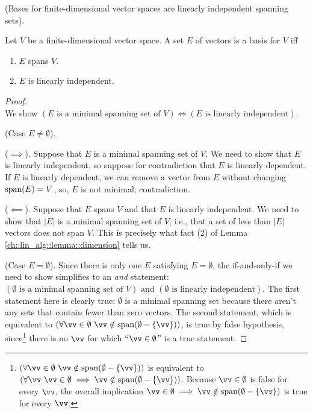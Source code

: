 \begin{theorem}
    (Bases for finite-dimensional vector spaces are linearly independent spanning sets).
    
    Let $V$ be a finite-dimensional vector space. A set $E$ of vectors is a basis for $V$ iff
    
    \begin{enumerate}
        \item $E$ spans $V$.
        \item $E$ is linearly independent.
    \end{enumerate}
\end{theorem}

\begin{proof}
    \mbox{} \\ \indent
    We show $(\text{$E$ is a minimal spanning set of $V$}) \iff (\text{$E$ is linearly independent})$.
    
    (Case $E \neq \emptyset$).
    
    \indent ($\implies$). Suppose that $E$ is a minimal spanning set of $V$. We need to show that $E$ is linearly independent, so suppose for contradiction that $E$ is linearly dependent. If $E$ is linearly dependent, we can remove a vector from $E$ without changing $\text{span}(E) = V$, so, $E$ is not minimal; contradiction.
    
    \indent ($\impliedby$). Suppose that $E$ spans $V$ and that $E$ is linearly independent. We need to show that $|E|$ is a minimal spanning set of $V$, i.e., that a set of less than $|E|$ vectors does not span $V$. This is precisely what fact (2) of Lemma \ref{ch::lin_alg::lemma::dimension} tells us.
    
    (Case $E = \emptyset$). Since there is only one $E$ satisfying $E = \emptyset$, the if-and-only-if we need to show simplifies to an \textit{and} statement: $(\text{$\emptyset$ is a minimal spanning set of $V$}) \text{ and } (\text{$\emptyset$ is linearly independent})$. The first statement here is clearly true: $\emptyset$ is a minimal spanning set because there aren't any sets that contain fewer than zero vectors. The second statement, which is equivalent to $(\forall \vv \in \emptyset \spc \vv \notin \spann(\emptyset - \{\vv\}))$, is true by false hypothesis, since\footnote{$(\forall \vv \in \emptyset \spc \vv \notin \spann(\emptyset - \{\vv\}))$ is equivalent to $(\forall \vv \spc \vv \in \emptyset \implies \vv \notin \spann(\emptyset - \{\vv\}))$. Because $\vv \in \emptyset$ is false for every $\vv$, the overall implication $\vv \in \emptyset \implies \vv \notin \spann(\emptyset - \{\vv\})$ is true for every $\vv$.} there is no $\vv$ for which ``$\vv \in \emptyset$'' is a true statement.
    
    
\end{proof}

